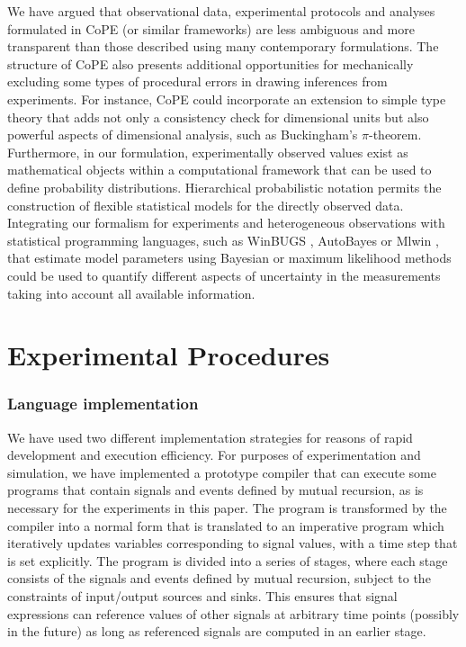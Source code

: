 We have argued that observational data, experimental protocols and
analyses formulated in CoPE (or similar frameworks) are less ambiguous
and more transparent than those described using many contemporary
formulations. The structure of CoPE also presents additional
opportunities for mechanically excluding some types of procedural
errors in drawing inferences from experiments. For instance, CoPE
could incorporate an extension to simple type theory
\citep{Kennedy1997} that adds not only a consistency check for
dimensional units but also powerful aspects of dimensional analysis,
such as Buckingham's $\pi$-theorem. Furthermore, in our formulation,
experimentally observed values exist as mathematical objects within a
computational framework that can be used to define probability
distributions. Hierarchical probabilistic notation \citep{Gelman2006}
permits the construction of flexible statistical models for the
directly observed data. Integrating our formalism for experiments and
heterogeneous observations with statistical programming languages,
such as WinBUGS \citep{Gilks1994}, AutoBayes \citep{AutoBayes} or
Mlwin \citep{mlwin}, that estimate model parameters using Bayesian or
maximum likelihood methods could be used to quantify different aspects
of uncertainty in the measurements taking into account all available
information.

\section*{Experimental Procedures}

\subsubsection*{Language implementation}

We have used two different implementation strategies for reasons of
rapid development and execution efficiency. For purposes of
experimentation and simulation, we have implemented a prototype
compiler that can execute some programs that contain signals and
events defined by mutual recursion, as is necessary for the
experiments in this paper. The program is transformed by the compiler
into a normal form that is translated to an imperative program which
iteratively updates variables corresponding to signal values, with a
time step that is set explicitly. The program is divided into a series
of stages, where each stage consists of the signals and events defined
by mutual recursion, subject to the constraints of input/output
sources and sinks. This ensures that signal expressions can reference
values of other signals at arbitrary time points (possibly in the
future) as long as referenced signals are computed in an earlier
stage.

